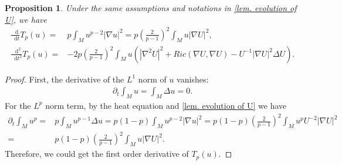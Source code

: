 \documentclass[11pt]{amsart}
\newtheorem{proposition}{Proposition}
\numberwithin{equation}{section}
\numberwithin{lemma}{section}
\numberwithin{proposition}{section}
\numberwithin{corollary}{section}
\numberwithin{remark}{section}
\newcommand{\dd}{\mathop{}\!\mathrm{d}}%
\begin{document}
\begin{proposition}\label{prop. two derivatives of Tsallis entropy}
    Under the same assumptions and notations in \cref{lem. evolution of U}, we have
    \begin{align*}
        \frac{\dd}{\dd t}T_p(u)
        =&p\int_M u^{p-2}|\nabla u|^2
        =p\left(\frac{2}{p-1}\right)^2\int_M u|\nabla U|^2,\\
        \frac{\dd^2}{\dd t^2}T_p(u)
        =&-2p\left(\frac{2}{p-1}\right)^2
        \int_M u
        \left(
        |\nabla^2 U|^2+Ric(\nabla U,\nabla U)
        -U^{-1}|\nabla U|^2\Delta U
        \right).
    \end{align*}
\end{proposition}
\begin{proof}
First, the derivative of the $L^1$ norm of $u$ vanishes:
    \begin{align*}
        \partial_t\int_M u=\int_M \Delta u=0.
    \end{align*}
    For the $L^p$ norm term, by the heat equation and \cref{lem. evolution of U} we have
    \begin{align*}
        \partial_t\int_M u^p
        =&p\int_M u^{p-1}\Delta u
        =p(1-p)\int_M u^{p-2}|\nabla u|^2
        =p(1-p)
        \left(\frac{2}{p-1}\right)^2\int_M u^pU^{-2}|\nabla U|^2\\
        =&p(1-p)\left(\frac{2}{p-1}\right)^2\int_M u|\nabla U|^2.
    \end{align*}
    Therefore, we could get the first order derivative of $T_p(u)$.
    

\end{proof}
\end{document}
